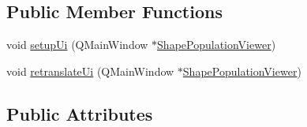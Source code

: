 \subsection*{Public Member Functions}
\begin{DoxyCompactItemize}
\item 
void \hyperlink{class_ui___shape_population_viewer_a58ba0c071f45f4e2f676d7e47dadbbb3}{setup\-Ui} (Q\-Main\-Window $\ast$\hyperlink{class_shape_population_viewer}{Shape\-Population\-Viewer})
\item 
void \hyperlink{class_ui___shape_population_viewer_aebe98684798a7ccdd7d979f3fde23be2}{retranslate\-Ui} (Q\-Main\-Window $\ast$\hyperlink{class_shape_population_viewer}{Shape\-Population\-Viewer})
\end{DoxyCompactItemize}
\subsection*{Public Attributes}

